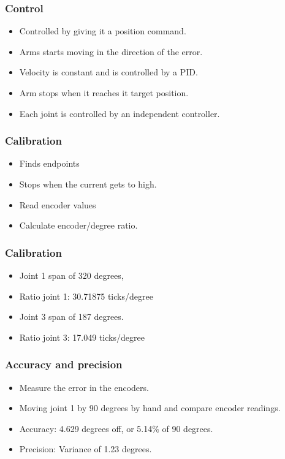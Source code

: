 \documentclass{beamer}
\begin{document}
  
  \begin{frame}
	\frametitle{Control}
	\begin{itemize}
      \item<1-> Controlled by giving it a position command.
      \item<1-> Arms starts moving in the direction of the error.
      \item<2-> Velocity is constant and is controlled by a PID.
      \item<2-> Arm stops when it reaches it target position.
      \item<3-> Each joint is controlled by an independent controller.
    \end{itemize}
  \end{frame}
  
  \begin{frame}
	\frametitle{Calibration}
	  \begin{itemize}
      	\item Finds endpoints
      	\item Stops when the current gets to high.
      	\item Read encoder values
      	\item Calculate encoder/degree ratio.
      \end{itemize}
  \end{frame}
  
    \begin{frame}
	\frametitle{Calibration}
	  \begin{itemize}
      	\item Joint 1 span of 320 degrees, 
      	\item Ratio joint 1: 30.71875 ticks/degree
      	\item Joint 3 span of 187 degrees.
      	\item Ratio joint 3: 17.049 ticks/degree
      \end{itemize}
  \end{frame}
  
  
  \begin{frame}
    \frametitle{Accuracy and precision}
    \begin{itemize}
      \item Measure the error in the encoders.
      \item Moving joint 1 by 90 degrees by hand and compare encoder readings.
      \item Accuracy: 4.629 degrees off, or 5.14\% of 90 degrees.
      \item Precision: Variance of 1.23 degrees.
	\end{itemize}
  \end{frame}
  
  \begin{frame}
  \end{frame}
\end{document}
